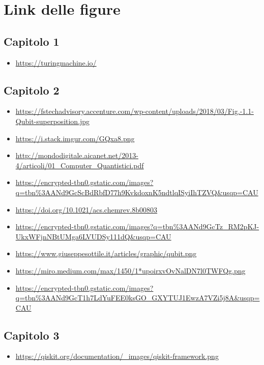 \chapter{Link delle figure}

\small
\sloppy
\section{Capitolo 1}
\begin{itemize}
    \renewcommand\labelitemi{--}
    \item \url{https://turingmachine.io/}
\end{itemize}

\section{Capitolo 2}
\begin{itemize}
    \renewcommand\labelitemi{--}
    \item \url{https://fstechadvisory.accenture.com/wp-content/uploads/2018/03/Fig.-1.1-Qubit-superposition.jpg}
    
    \item \url{https://i.stack.imgur.com/GQxa8.png}

    \item \url{http://mondodigitale.aicanet.net/2013-4/articoli/01\_Computer\_Quantistici.pdf}

    \item \url{https://encrypted-tbn0.gstatic.com/images?q=tbn\%3AANd9GcScBdRbfD77h9KvkdoxnK5ndtlqISyiIhTZVQ\&usqp=CAU}

    \item \url{https://doi.org/10.1021/acs.chemrev.8b00803}
    
    \item \url{https://encrypted-tbn0.gstatic.com/images?q=tbn\%3AANd9GcTz_RM2pKJ-UkxWFjnNBtUMga6LVUDSy111dQ\&usqp=CAU}
    
    \item \url{https://www.giuseppesottile.it/articles/graphic/qubit.png}
    
    \item \url{https://miro.medium.com/max/1450/1*upoirxvOvNalDN7l0TWFQg.png}
    
    \item \url{https://encrypted-tbn0.gstatic.com/images?q=tbn\%3AANd9GcT1h7LdYuFEE0ksGO_GXYTUJ1EwzA7VZi5j8A\&usqp=CAU}
\end{itemize}

\section{Capitolo 3}
\begin{itemize}
    \renewcommand\labelitemi{--}
    \item \url{https://qiskit.org/documentation/_images/qiskit-framework.png}
\end{itemize}